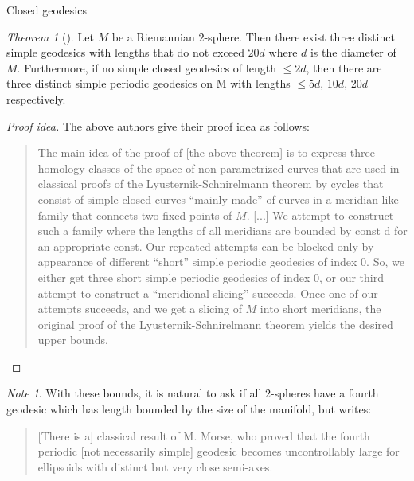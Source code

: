 \documentclass{article}
\theoremstyle{definition}
\theoremstyle{remark}
\newtheorem{remark}{Note}[section]
\newtheorem{theorem}{Theorem}[section]
\begin{document}
\begin{section}{Closed geodesics}
  \begin{theorem}[\cite{Liokumovich}]
    Let $M$ be a Riemannian $2$-sphere. Then there exist three distinct simple
    geodesics with lengths that do not exceed $20d$ where $d$ is the diameter
    of $M$.
    Furthermore, if no simple closed geodesics of length $\leq 2d$, then there
    are three distinct simple periodic geodesics on M with lengths
    $\leq 5d$, $10d$,  $20d$ respectively.
  \end{theorem}
  \begin{proof}[Proof idea]
    The above authors give their proof idea as follows: \begin{quote}
      The main idea of the proof of [the above theorem] is to express three homology
      classes of the space of non-parametrized curves that are used in classical
      proofs of the Lyusternik-Schnirelmann theorem by cycles that consist of
      simple closed curves ``mainly made'' of curves in a meridian-like family
      that connects two fixed points of $M$. [...] We attempt to construct such
      a family where the lengths of all meridians are bounded by const d for an
      appropriate const. Our repeated attempts can be blocked only by appearance
      of different “short” simple periodic geodesics of index 0. So, we either
      get three short simple periodic geodesics of index 0, or our third attempt
      to construct a “meridional slicing” succeeds. Once one of our attempts
      succeeds, and we get a slicing of $M$ into short meridians, the original
      proof of the Lyusternik-Schnirelmann theorem yields the desired upper
      bounds.
    \end{quote}
  \end{proof}
  \begin{remark}
    With these bounds, it is natural to ask if all $2$-spheres have a fourth
    geodesic which has length bounded by the size of the manifold, but
    \cite{Liokumovich} writes:
    \begin{quote}
      [There is a] classical result of M. Morse, who proved that the fourth periodic
      [not necessarily simple] geodesic becomes uncontrollably large for
      ellipsoids with distinct but very close semi-axes.
    \end{quote}
  \end{remark}
\end{section}
\end{document}
